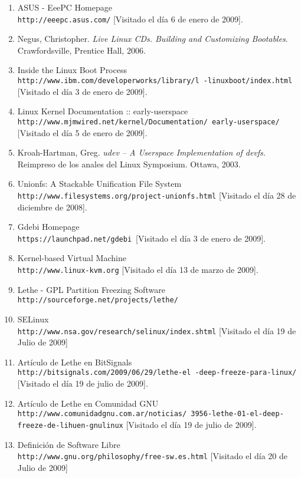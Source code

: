 \documentclass[final,narroweqnarray,inline,twoside]{ieee}
\begin{document}
\begin{enumerate}
\item ASUS - EeePC Homepage\\
\texttt{http://eeepc.asus.com/} [Visitado el día 6 de enero de 2009].
\item Negus, Christopher. \textit{Live Linux CDs. Building and Customizing Bootables}. Crawfordsville, Prentice Hall, 2006.
\item Inside the Linux Boot Process\\
\texttt{http://www.ibm.com/developerworks/library/l -linuxboot/index.html} [Visitado el día 3 de enero de 2009].
\item Linux Kernel Documentation :: early-userspace\\
\texttt{http://www.mjmwired.net/kernel/Documentation/ early-userspace/} [Visitado el día 5 de enero de 2009].
\item Kroah-Hartman, Greg. \textit{udev – A Userspace Implementation of devfs.} Reimpreso de los anales del Linux Symposium. Ottawa, 2003.
\item Unionfs: A Stackable Unification File System\\
\texttt{http://www.filesystems.org/project-unionfs.html}
[Visitado el día 28 de diciembre de 2008].
\item Gdebi Homepage\\
\texttt{https://launchpad.net/gdebi}\
[Visitado el día 3 de enero de 2009].
\item Kernel-based Virtual Machine\\
\texttt{http://www.linux-kvm.org} [Visitado el día 13 de marzo de 2009].
\item Lethe - GPL Partition Freezing Software\\
\texttt{http://sourceforge.net/projects/lethe/}
\item SELinux\\
\texttt{http://www.nsa.gov/research/selinux/index.shtml}
[Visitado el día 19 de Julio de 2009]
\item Artículo de Lethe en BitSignals\\
\texttt{http://bitsignals.com/2009/06/29/lethe-el -deep-freeze-para-linux/} [Visitado el día 19 de julio de 2009].
\item Artículo de Lethe en Comunidad GNU\\
\texttt{http://www.comunidadgnu.com.ar/noticias/ 3956-lethe-01-el-deep-freeze-de-lihuen-gnulinux} [Visitado el día 19 de julio de 2009].
\item Definición de Software Libre\\
\texttt{http://www.gnu.org/philosophy/free-sw.es.html} [Visitado el día 20 de Julio de 2009]
\end{enumerate}
\end{document}

